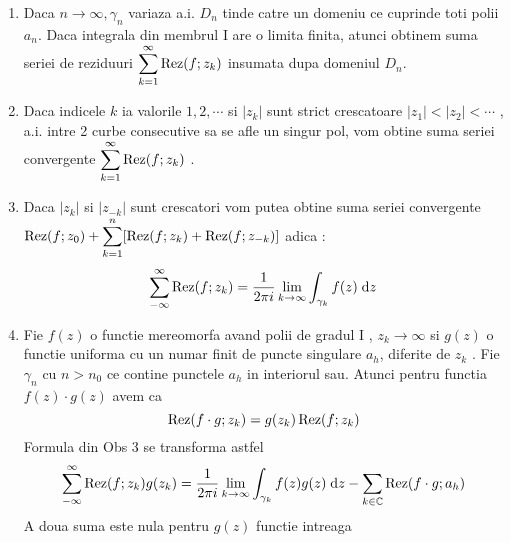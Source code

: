     \begin{observation}\leavevmode
        \begin{enumerate}
            \item Daca $n \to \infty, \gamma_n$ variaza a.i. $D_n$ tinde catre un domeniu
                ce cuprinde toti polii $a_n$. Daca integrala din membrul $\mathrm{I}$ are o limita finita,
                atunci obtinem suma seriei de reziduuri $\displaystyle \sum_{k=1}^{\infty}\operatorname{Rez}(f;z_k)$ insumata
                dupa domeniul $D_n$.
            \item Daca indicele $k$ ia valorile $1,2,\cdots $ si $|z_k|$ sunt strict crescatoare
                $|z_1|<|z_2|< \cdots$ , a.i. intre 2 curbe consecutive sa se afle un singur pol,
                vom obtine suma seriei convergente $\displaystyle \sum_{k=1}^{\infty}\operatorname{Rez}(f;z_k)$ .
            \item Daca  $|z_k|$ si  $|z_{-k}|$ sunt crescatori vom putea obtine suma seriei
                convergente  $\displaystyle \operatorname{Rez}(f;z_0) + \sum_{k=1}^{n}[\operatorname{Rez}(f;z_k)+ \operatorname{Rez}(f;z_{-k})]$ adica :
                \[
                    \sum_{-\infty}^{\infty} \operatorname{Rez}(f;z_k)
                        = \frac{1}{2 \pi i} \lim_{k\to \infty} \int_{\gamma_k} f(z) \; \mathrm{d} z
                \]
            \item Fie $f(z)$ o functie mereomorfa avand polii de gradul $\mathrm{I}$ , $z_k \to \infty$ si
                $g(z)$ o functie uniforma cu un numar finit de puncte singulare $a_h$, diferite de
                $z_k$ . Fie $\gamma_n$ cu $n>n_0$ ce contine punctele $a_h$ in interiorul sau.
                Atunci pentru functia $f(z)\cdot g(z)$ avem ca
                \[
                    \operatorname{Rez}(f\cdot g;z_k)=g(z_k) \operatorname{Rez}(f;z_k)
                \]
                Formula din Obs 3 se transforma astfel
                \[
                    \sum_{-\infty}^{\infty} \operatorname{Rez}(f;z_k) g(z_k)
                        = \frac{1}{2 \pi i} \lim_{k\to \infty} \int_{\gamma_k} f(z)g(z) \; \mathrm{d} z
                        - \sum_{k\in\mathbb{C}} \operatorname{Rez}(f\cdot g; a_h)
                \]
                A doua suma este nula pentru $g(z)$ functie intreaga
        \end{enumerate}
    \end{observation}


